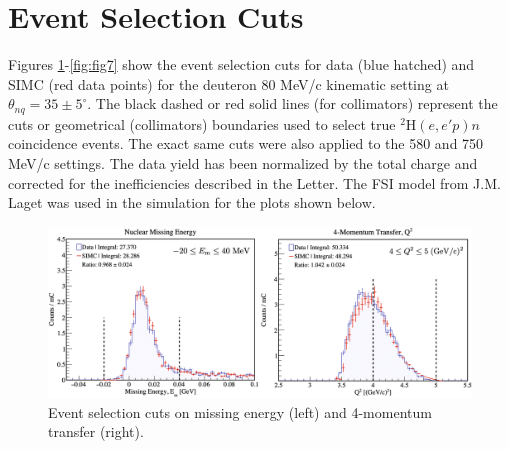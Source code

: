 \documentclass[aps, prl]{revtex4-2}  %
\begin{document}
\section{\large Event Selection Cuts}
\noindent Figures \ref{fig:fig3}-\ref{fig:fig7} show the event selection cuts for data (blue hatched) and SIMC (red data points) for the deuteron 80 MeV/c kinematic setting at $\theta_{nq}=35\pm5^{\circ}$.
The black dashed or red solid lines (for collimators) represent the cuts or geometrical (collimators) boundaries used to select true $^{2}$H$(e,e'p)n$ coincidence events.
The exact same cuts were also applied to the 580 and 750 MeV/c settings. The data yield has been normalized by the total charge and corrected for the inefficiencies described in the Letter.
The FSI model from J.M. Laget was used in the simulation for the plots shown below.
\begin{figure}[!h]
\includegraphics[scale=0.30]{plots/Em_and_Q2_CUT_80MeV_35deg.png}
\caption{Event selection cuts on missing energy (left) and 4-momentum transfer (right).}
\label{fig:fig3}
\end{figure}
\clearpage
\end{document}
